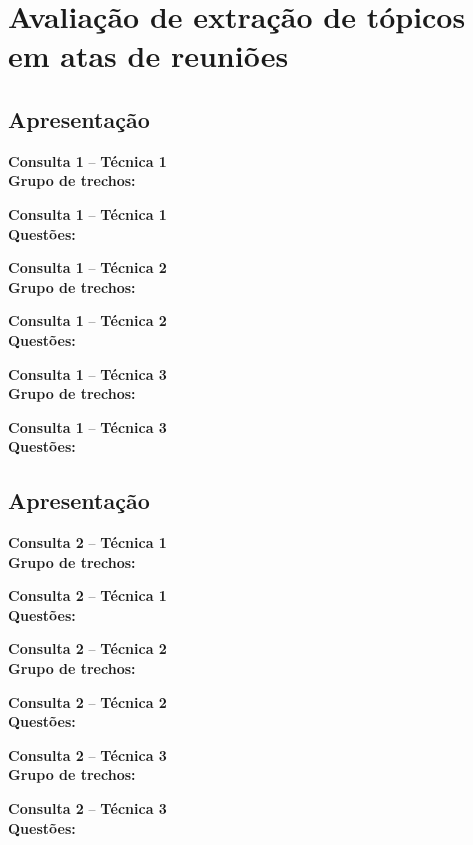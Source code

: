 \documentclass{article}
\newcommand{\resultsheader}[2] {
	\noindent \textbf{Consulta #1} -- \textbf{Técnica #2}
	 \vspace{0.5 cm} \\
	
}
\newcommand{\textfiled}{

	\vspace{0.5cm}
	\begin{tcolorbox}[colback = white]
		\vspace{1cm}

	\end{tcolorbox}
}
\begin{document}
\pagestyle{empty}

\section*{Avaliação de extração de tópicos em atas de reuniões}
\vspace{1cm}






\subsection*{Apresentação}


\textfiled

\newpage \resultsheader{1}{1} \noindent \textbf{Grupo de trechos:}
 
\newpage \resultsheader{1}{1}  \noindent \textbf{Questões:}


\newpage \resultsheader{1}{2} \noindent \textbf{Grupo de trechos:}
 	
\newpage  \resultsheader{1}{2} \noindent \textbf{Questões:}


\newpage \resultsheader{1}{3} \noindent \textbf{Grupo de trechos:}
 	
\newpage  \resultsheader{1}{3}  \noindent \textbf{Questões:}














\newpage
\subsection*{Apresentação}


\textfiled

\newpage \resultsheader{2}{1} \noindent \textbf{Grupo de trechos:}
 
\newpage \resultsheader{2}{1}  \noindent \textbf{Questões:}


\newpage \resultsheader{2}{2} \noindent \textbf{Grupo de trechos:}
 	
\newpage  \resultsheader{2}{2} \noindent \textbf{Questões:}


\newpage \resultsheader{2}{3} \noindent \textbf{Grupo de trechos:}
 	
\newpage  \resultsheader{2}{3}  \noindent \textbf{Questões:}

\end{document}
